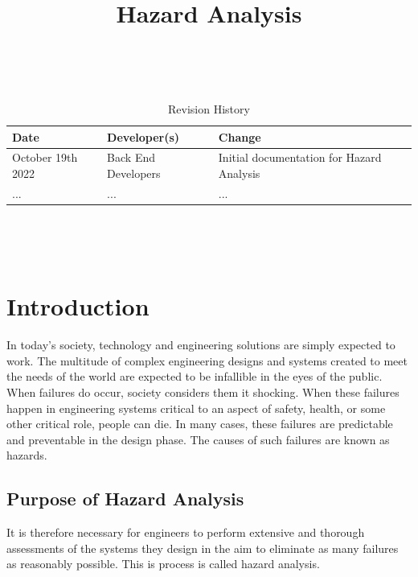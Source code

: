 \documentclass{article}
\title{Hazard Analysis\\\progname}
\author{\authname}
\date{}
\begin{document}
\maketitle
\thispagestyle{empty}

~\newpage


\begin{table}[hp]
	\caption{Revision History} \label{TblRevisionHistory}
	\begin{tabularx}{\textwidth}{llX}
		\toprule
		\textbf{Date} & \textbf{Developer(s)} & \textbf{Change}        \\
		\midrule
		October 19th 2022        & Back End Developers              & Initial documentation for Hazard Analysis \\
		...           & ...                   & ...                    \\
		\bottomrule
	\end{tabularx}
\end{table}

~\newpage

\tableofcontents
\listoffigures
\listoftables

~\newpage


\section{Introduction}

In today's society, technology and engineering solutions are simply expected to work. The multitude of complex engineering designs and systems created to meet the needs of the world are expected to be infallible in the eyes of the public. When failures do occur, society considers them it shocking. When these failures happen in engineering systems critical to an aspect of safety, health, or some other critical role, people can die. In many cases, these failures are predictable and preventable in the design phase. The causes of such failures are known as hazards.
\subsection{Purpose of Hazard Analysis}

It is therefore necessary for engineers to perform extensive and thorough assessments of the systems they design in the aim to eliminate as many failures as reasonably possible. This is process is called hazard analysis.\\
\end{document}
